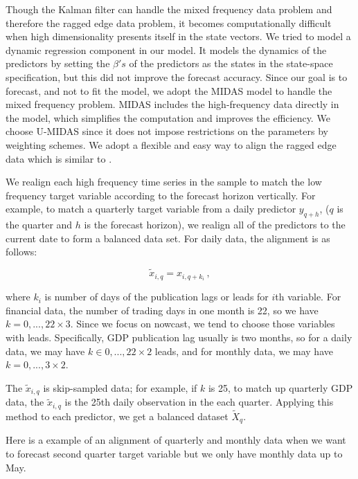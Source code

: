 Though the Kalman filter can handle the mixed frequency data problem and therefore the ragged edge data problem, it becomes computationally difficult when  high dimensionality presents itself in the state vectors.  We tried to model a dynamic regression component in our model. It models the dynamics of the predictors by setting the $\beta's$ of the predictors as the states in the state-space specification, but this did not improve the forecast accuracy. Since our goal is to forecast, and not to fit the model,  we adopt the MIDAS model to handle the mixed frequency problem. MIDAS includes the high-frequency data directly in the model, which simplifies the computation and improves the efficiency. We choose U-MIDAS since it does not impose restrictions on the parameters by weighting schemes. We adopt a flexible and easy way to align the ragged edge data which is similar to . 

We realign each  high frequency time series in the sample to match the low frequency target variable according to the  forecast horizon  vertically. For example, to match a quarterly target variable from a daily predictor $y_{q+h}$, ($q$ is the quarter and $h$ is the forecast horizon), we realign all of the predictors to the current date to form a balanced data set. For daily data, the alignment is as follows:

$$\tilde x_{i, q} = x_{i, q + k_{i}} \, ,$$

where $k_{i}$ is number of days of the publication lags or leads for $i$th variable. For financial data, the number of trading days in one month is 22, so we have $k = {0, ...,22 \times 3}$. Since we focus on nowcast, we tend to choose those variables with leads. Specifically, GDP publication lag usually is two months, so for a daily data, we may have $k \in {0, ...,22 \times 2}$ leads, and for  monthly data, we may have $k = {0, ..., 3 \times 2}$. 

The $\tilde x_{i, q}$ is skip-sampled data; for example, if $k$ is 25, to match up quarterly GDP data, the $\tilde x_{i, q}$ is the 25th daily observation in the each quarter. Applying this method to each predictor, we get a balanced dataset $\tilde X_q$. 

Here is a example of an alignment of quarterly and monthly data when we want to forecast second quarter target variable but we only have monthly data up to May.

